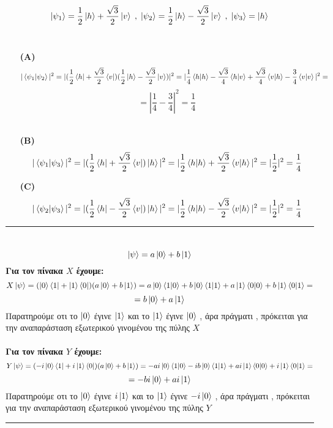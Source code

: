 \documentclass[12pt]{article}
\begin{document}
$$\ket{\psi_1} = \frac{1}{2}\ket{h}+\frac{\sqrt{3}}{2}\ket{v} \;,\;\ket{\psi_2} = \frac{1}{2}\ket{h}-\frac{\sqrt{3}}{2}\ket{v} \;,\; \ket{\psi_3} = \ket{h}$$\\
\begin{enumerate}
    

    \item[\bf (A)] $$|\braket{\psi_1|\psi_2}|^2 = | (\frac{1}{2}\bra{h}+\frac{\sqrt{3}}{2}\bra{v} )( \frac{1}{2}\ket{h}-\frac{\sqrt{3}}{2}\ket{v})|^2 
=|\frac{1}{4}\braket{h|h} -\frac{\sqrt{3}}{4}\braket{h|v} + \frac{\sqrt{3}}{4}\braket{v|h}-\frac{3}{4}\braket{v|v} |^2= $$
$$= |\frac{1}{4} - \frac{3}{4}|^2 = \frac{1}{4} $$\\
\item[\bf (B)] $$|\braket{\psi_1|\psi_3}|^2 = | (\frac{1}{2}\bra{h}+\frac{\sqrt{3}}{2}\bra{v} )\ket{h}|^2 
=|\frac{1}{2}\braket{h|h}  + \frac{\sqrt{3}}{2}\braket{v|h} |^2= |\frac{1}{2} |^2 = \frac{1}{4} $$

\item[\bf (\textlatin{C})] $$|\braket{\psi_2|\psi_3}|^2 = | (\frac{1}{2}\bra{h}-\frac{\sqrt{3}}{2}\bra{v} )\ket{h}|^2 
=|\frac{1}{2}\braket{h|h}  - \frac{\sqrt{3}}{2}\braket{v|h} |^2= |\frac{1}{2} |^2 = \frac{1}{4} $$

\end{enumerate}
\rule{\textwidth}{.5pt}
\section*{{}}
    $$\ket{\psi} = a\ket{0}+b\ket{1} $$
{\bf Για τον πίνακα $ X$ έχουμε:} 
$$X\ket{\psi} = (\ket{0}\bra{1} + \ket{1}\bra{0})(a\ket{0}+b\ket{1}) = a\ket{0}\braket{1|0} +b\ket{0}\braket{1|1} + a \ket{1}\braket{0|0}+b\ket{1}\braket{0|1} =$$
$$= b\ket{0} + a\ket{1}  $$
Παρατηρούμε οτι το $\ket{0}$ έγινε $\ket{1}$ και το $\ket{1}$ έγινε $\ket{0}$ , άρα πράγματι , πρόκειται για την αναπαράσταση εξωτερικού γινομένου της πύλης $X$\\ \\
{\bf Για τον πίνακα $Y$ έχουμε:} 
$$Y\ket{\psi} = (-i\ket{0}\bra{1} + i\ket{1}\bra{0})(a\ket{0}+b\ket{1}) = -ai\ket{0}\braket{1|0} -ib\ket{0}\braket{1|1} + ai\ket{1}\braket{0|0}+i\ket{1}\braket{0|1} =$$
$$= -bi\ket{0} + ai\ket{1}  $$
Παρατηρούμε οτι το $\ket{0}$ έγινε $i\ket{1}$ και το $\ket{1}$ έγινε $-i\ket{0}$ , άρα πράγματι , πρόκειται για την αναπαράσταση εξωτερικού γινομένου της πύλης $Y$
\\\rule{\textwidth}{.5pt}
\end{document}

